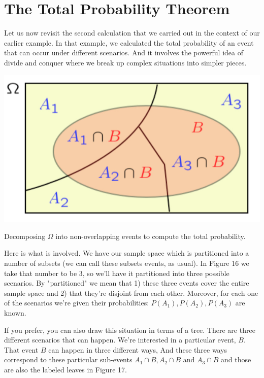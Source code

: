 \documentclass{tufte-handout}
\begin{document}
\section{The Total Probability Theorem}\label{sec:TotalProb}



Let us now revisit the second calculation that we carried out in the context of our earlier example. In
that example, we calculated the total probability of an event that can occur under different scenarios.
And it involves the powerful idea of divide and conquer where we break up complex situations into
simpler pieces.

\begin{marginfigure}
  \includegraphics{TotalProb}
  \caption{Decomposing $\Omega$ into non-overlapping events to compute the total probability.}
\end{marginfigure}


Here is what is involved. We have our sample space which is partitioned into a
number of subsets (we can call these subsets events, as usual). In Figure 16 we take that number to be 3, so we'll have it partitioned into
three possible scenarios. By "partitioned" we mean that 1) these three events cover the entire sample space
and 2) that they're disjoint from each other. Moreover, for each one of the scenarios we're given their probabilities: $P(A_1), P(A_2), P(A_3)$ are known.

If you prefer, you can also draw this situation in terms of a tree. There are three different scenarios that
can happen. We're interested in a particular event, $B$. That event $B$ can happen in three different ways, And these 
three ways correspond
to these particular sub-events $A_1 \cap B, A_2 \cap B \text{ and } A_3 \cap B$ and those are also the labeled leaves in Figure 17.
\end{document}
